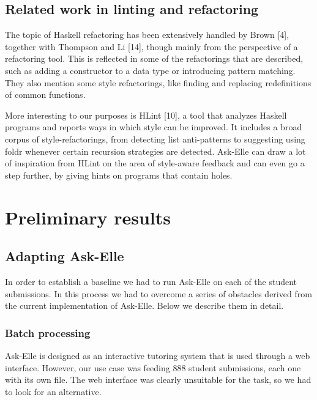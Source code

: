 \documentclass[a4paperpaper,]{report}
\begin{document}
\hypertarget{related-work-in-linting-and-refactoring}{%
\section{Related work in linting and
refactoring}\label{related-work-in-linting-and-refactoring}}

The topic of Haskell refactoring has been extensively handled by Brown
{[}4{]}, together with Thompson and Li {[}14{]}, though mainly from the
perspective of a refactoring tool. This is reflected in some of the
refactorings that are described, such as adding a constructor to a data
type or introducing pattern matching. They also mention some style
refactorings, like finding and replacing redefinitions of common
functions.

More interesting to our purposes is HLint {[}10{]}, a tool that analyzes
Haskell programs and reports ways in which style can be improved. It
includes a broad corpus of style-refactorings, from detecting list
anti-patterns to suggesting using foldr whenever certain recursion
strategies are detected. Ask-Elle can draw a lot of inspiration from
HLint on the area of style-aware feedback and can even go a step
further, by giving hints on programs that contain holes.

\hypertarget{results}{%
\chapter{Preliminary results}\label{results}}

\hypertarget{adapting-ask-elle}{%
\section{Adapting Ask-Elle}\label{adapting-ask-elle}}

In order to establish a baseline we had to run Ask-Elle on each of the
student submissions. In this process we had to overcome a series of
obstacles derived from the current implementation of Ask-Elle. Below we
describe them in detail.

\hypertarget{batch-processing}{%
\subsection{Batch processing}\label{batch-processing}}

Ask-Elle is designed as an interactive tutoring system that is used
through a web interface. However, our use case was feeding 888 student
submissions, each one with its own file. The web interface was clearly
unsuitable for the task, so we had to look for an alternative.
\end{document}
